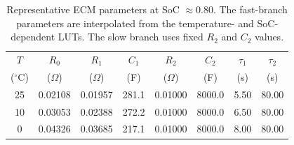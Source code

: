 \begin{table}[t]
\caption{Representative ECM parameters at SoC $\approx 0.80$. The fast-branch parameters are interpolated from the temperature- and SoC-dependent LUTs. The slow branch uses fixed $R_2$ and $C_2$ values.}
\label{tab:ecm_parameters}
\centering
\begin{tabular}{c c c c c c c c}
\hline
$T$ & $R_0$ & $R_1$ & $C_1$ & $R_2$ & $C_2$ & $\tau_1$ & $\tau_2$ \\
($^\circ$C) & ($\Omega$) & ($\Omega$) & (F) & ($\Omega$) & (F) & (s) & (s) \\
\hline
25 & 0.02108 & 0.01957 & 281.1 & 0.01000 & 8000.0 & 5.50 & 80.00 \\
10 & 0.03053 & 0.02388 & 272.2 & 0.01000 & 8000.0 & 6.50 & 80.00 \\
0 & 0.04326 & 0.03685 & 217.1 & 0.01000 & 8000.0 & 8.00 & 80.00 \\
\hline
\end{tabular}
\end{table}
